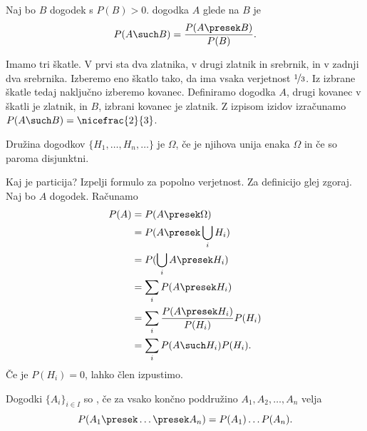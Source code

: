 

\begin{definicija}
  Naj bo $B$ dogodek s $P(B) > 0$.
   dogodka $A$ glede na $B$ je
  \[
    P(A \such B) = \frac{P(A \presek B)}{P(B)}.
  \]
\end{definicija}


\begin{primer}
  Imamo tri škatle.
  V prvi sta dva zlatnika, v drugi zlatnik in srebrnik, in v zadnji dva
  srebrnika.
  Izberemo eno škatlo tako, da ima vsaka verjetnost $\nicefrac{1}{3}$.
  Iz izbrane škatle tedaj naključno izberemo kovanec.
  Definiramo dogodka $A$, drugi kovanec v škatli je zlatnik, in $B$, izbrani
  kovanec je zlatnik.
  Z izpisom izidov izračunamo $P(A \such B) = \nicefrac{2}{3}$.
\end{primer}

\begin{definicija}
  Družina dogodkov $\{H_1, \ldots, H_n, \ldots\}$ je  $\Omega$,
  če je njihova unija enaka $\Omega$ in če so paroma disjunktni.
\end{definicija}

\begin{vo}{Kaj je particija? Izpelji formulo za popolno verjetnost.}
  Za definicijo glej zgoraj.
  Naj bo $A$ dogodek.
  Računamo
  \begin{align*}
    P(A) &= P(A \presek \Omega) \\
         &= P(A \presek \bigcup_i H_i) \\
         &= P(\bigcup_i A \presek H_i) \\
         &= \sum_i P(A \presek H_i) \\
         &= \sum_i \frac{P(A \presek H_i)}{P(H_i)} P(H_i) \\
         &= \sum_i P(A \such H_i) P(H_i).
  \end{align*}
  Če je $P(H_i) = 0$, lahko člen izpustimo.
\end{vo}


\begin{definicija}
  Dogodki $\{A_i\}_{i \in I}$ so , če za vsako končno
  poddružino $A_1, A_2, \ldots, A_n$ velja
  \[
    P(A_1 \presek \ldots \presek A_n) = P(A_1) \ldots P(A_n).
  \]
\end{definicija}


